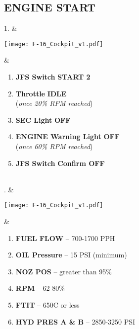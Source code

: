 \documentclass[fontInter]{TechCheck}
\begin{document}
	\subsection{ENGINE START}
	\begin{listlongtable}
		1. & 
		\begin{minipage}[t]{\linewidth}
			\vspace{-7pt}
			\centering
			\texttt{[image: F-16\_Cockpit\_v1.pdf]}
		\end{minipage} &
		\begin{minipage}[t]{\linewidth}
			\vspace{-7pt}
			\begin{enumerate}
				\item \textbf{JFS Switch} \dotfill \textbf{START 2}
				\item \textbf{Throttle} \dotfill \textbf{IDLE} \\
				\hfill (\emph{once 20\% RPM reached})
				\item \textbf{SEC Light} \dotfill \textbf{OFF} 
				\item \textbf{ENGINE Warning Light} \dotfill \textbf{OFF} \\
				\hfill (\emph{once 60\% RPM reached})
				\item \textbf{JFS Switch} \dotfill \textbf{Confirm OFF}
			\end{enumerate}
		\end{minipage} \\
		. & 
		\begin{minipage}[t]{\linewidth}
			\vspace{-7pt}
			\centering
			\texttt{[image: F-16\_Cockpit\_v1.pdf]}
		\end{minipage} &
		\begin{minipage}[t]{\linewidth}
			\vspace{-7pt}
			\begin{enumerate}
				\item \textbf{FUEL FLOW} -- 700-1700 PPH
				\item \textbf{OIL Pressure} -- 15 PSI (minimum)
				\item \textbf{NOZ POS} -- greater than 95\%
				\item \textbf{RPM} -- 62-80\% 
				\item \textbf{FTIT} -- 650C or less
				\item \textbf{HYD PRES A \& B} -- 2850-3250 PSI
			\end{enumerate}
		\end{minipage} \\
	\end{listlongtable}
\end{document}
